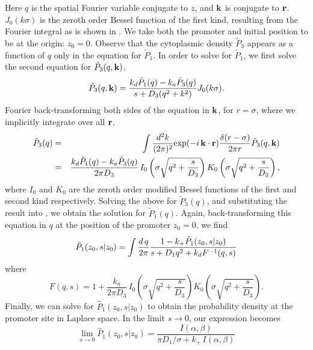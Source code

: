 Here $q$ is the spatial Fourier variable conjugate to $z$, and ${\bf k}$ is conjugate to ${\bf r}$. $J_0(k\sigma)$ is the zeroth order Bessel function of the first kind, resulting from the Fourier integral as is shown in . We take both the promoter and initial position to be at the origin: $z_0 = 0$. Observe that the cytoplasmic density $\tilde{P}_3$ appears as a function of $q$ only in the equation for $\tilde{P}_1$. In order to solve for $\tilde{P}_1$, we first solve the second equation for $\tilde{P}_3(q,{\bf k})$, 
\begin{equation}
 \tilde{P}_3(q,{\bf k}) = \frac{k_d \tilde{P}_1(q) - k_a\tilde{P}_3(q)}{s + D_3(q^2 + k^2)} J_{0}(k \sigma ).
\end{equation}
Fourier back-transforming both sides of the equation in ${\bf k}$, for $r=\sigma$, where we implicitly integrate over all ${\bf r}$,
\begin{eqnarray}
 \elabel{FourierBackC}
 \tilde{P}_3(q) & = & \int \frac{d^2 k}{(2 \pi)^2} {\rm exp}(-i\,{\bf k}\cdot{\bf r}) \frac{\delta(r-\sigma)}{2\pi r} \tilde{P}_3(q,{\bf k}) \\
 & = & \frac{k_d \tilde{P}_1(q) - k_a\tilde{P}_3(q)}{2 \pi D_3} \, I_{0}\left( \sigma \sqrt{q^2 + \frac{s}{D_3}} \right) K_{0}\left( \sigma \sqrt{q^2 + \frac{s}{D_3}} \right),
\end{eqnarray}
where $I_0$ and $K_0$ are the zeroth order modified Bessel functions of the first and second kind respectively. Solving the above for $\tilde{P}_3(q)$, and substituting the result into , we obtain the solution for $\tilde{P}_1(q)$. Again, back-transforming this equation in $q$ at the position of the promoter $z_0=0$, we find
\begin{equation}
 \hat{P}_1(z_0,s|z_0) = \int \frac{d\,q}{2 \pi} \frac{1 - k_+ \hat{P}_1(z_0,s|z_0)}{s + D_1 q^2+k_d F^{-1}(q,s)}
 \elabel{FDE_dna2}
\end{equation}
where
\begin{equation}
F(q,s) = 1 + \frac{k_a}{2 \pi D_3} \, I_{0}\left( \sigma \sqrt{q^2 + \frac{s}{D_3}} \right) K_{0}\left( \sigma \sqrt{q^2 + \frac{s}{D_3}} \right).
\end{equation}
Finally, we can solve  for $\hat{P}_1(z_0, s|z_0)$ to obtain the probability density at the promoter site in Laplace space. In the limit $s \to 0$, our expression becomes
\begin{equation}
 \lim_{s \to 0} \hat{P}_1(z_0, s|z_0) = \frac{I(\alpha,\beta)}{\pi D_1 / \sigma + k_+ \, I(\alpha,\beta)}
\end{equation}
